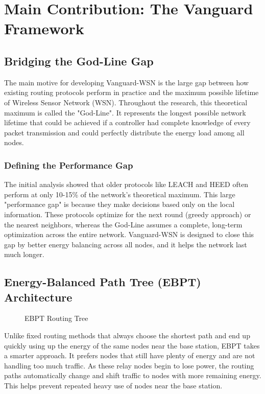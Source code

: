 \documentclass[conference]{IEEEtran}
\begin{document}
\section{Main Contribution: The Vanguard Framework}

\subsection{Bridging the God-Line Gap}
The main motive for developing Vanguard-WSN is the large gap between how existing routing protocols perform in practice and the maximum possible lifetime of Wireless Sensor Network (WSN). Throughout the research, this theoretical maximum is called the "God-Line". It represents the longest possible network lifetime that could be achieved if a controller had complete knowledge of every packet transmission and could perfectly distribute the energy load among all nodes.

\subsubsection{Defining the Performance Gap}
The initial analysis showed that older protocols like LEACH and HEED often perform at only 10-15\% of the network’s theoretical maximum. This large "performance gap" is because they make decisions based only on the local information. These protocols optimize for the next round (greedy approach) or the nearest neighbors, whereas the God-Line assumes a complete, long-term optimization across the entire network. Vanguard-WSN is designed to close this gap by better energy balancing across all nodes, and it helps the network last much longer.

\subsection{Energy-Balanced Path Tree (EBPT) Architecture}

\begin{figure}[htbp]
\centerline{}
\caption{EBPT Routing Tree}
\label{fig3}
\end{figure}

Unlike fixed routing methods that always choose the shortest path and end up quickly using up the energy of the same nodes near the base station, EBPT takes a smarter approach. It prefers nodes that still have plenty of energy and are not handling too much traffic. As these relay nodes begin to lose power, the routing paths automatically change and shift traffic to nodes with more remaining energy. This helps prevent repeated heavy use of nodes near the base station.
\end{document}
